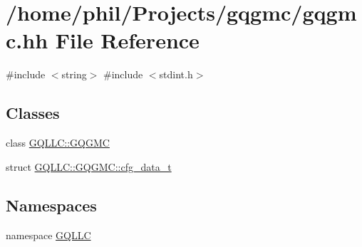 \hypertarget{gqgmc_8hh}{\section{/home/phil/\-Projects/gqgmc/gqgmc.hh \-File \-Reference}
\label{gqgmc_8hh}
}
{\ttfamily \#include $<$string$>$}\*
{\ttfamily \#include $<$stdint.\-h$>$}\*
\subsection*{\-Classes}
\begin{DoxyCompactItemize}
\item 
class \hyperlink{class_g_q_l_l_c_1_1_g_q_g_m_c}{\-G\-Q\-L\-L\-C\-::\-G\-Q\-G\-M\-C}
\item 
struct \hyperlink{struct_g_q_l_l_c_1_1_g_q_g_m_c_1_1cfg__data__t}{\-G\-Q\-L\-L\-C\-::\-G\-Q\-G\-M\-C\-::cfg\-\_\-data\-\_\-t}
\end{DoxyCompactItemize}
\subsection*{\-Namespaces}
\begin{DoxyCompactItemize}
\item 
namespace \hyperlink{namespace_g_q_l_l_c}{\-G\-Q\-L\-L\-C}
\end{DoxyCompactItemize}
